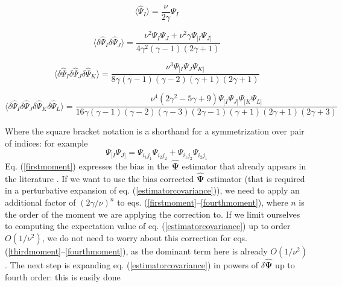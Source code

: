 \documentclass[reprint,aps,prd,superscriptaddress,showkeys,showpacs]{revtex4-1}
\newcommand{\bbh}[1]{\mathbf{\hat{#1}}}
\newcommand{\h}[1]{\hat{#1}}
\begin{document}
\begin{widetext}

\begin{equation}
\label{firstmoment}
\langle\h{\Psi}_I\rangle = \frac{\nu}{2\gamma}\Psi_I
\end{equation}

\begin{equation}
\label{secondmoment}
\langle\delta\h{\Psi}_I\delta\h{\Psi}_J\rangle = \frac{\nu^2\Psi_I\Psi_J + \nu^2\gamma\Psi_{[I}\Psi_{J]}}{4\gamma^2(\gamma-1)(2\gamma+1)}
\end{equation}

\begin{equation}
\label{thirdmoment}
\langle\delta\h{\Psi}_I\delta\h{\Psi}_J\delta\h{\Psi}_K\rangle = \frac{\nu^3\Psi_{[I}\Psi_J\Psi_{K]}}{8\gamma(\gamma-1)(\gamma-2)(\gamma+1)(2\gamma+1)}
\end{equation}

\begin{equation}
\label{fourthmoment}
\langle\delta\h{\Psi}_I\delta\h{\Psi}_J\delta\h{\Psi}_K\delta\h{\Psi}_L\rangle = \frac{\nu^4(2\gamma^2-5\gamma+9)\Psi_{[I}\Psi_{J]}\Psi_{[K}\Psi_{L]}}{16\gamma(\gamma-1)(\gamma-2)(\gamma-3)(2\gamma-1)(\gamma+1)(2\gamma+1)(2\gamma+3)}
\end{equation}

\end{widetext}
%
Where the square bracket notation is a shorthand for a symmetrization over pair of indices: for example
\begin{equation}
\Psi_{[I}\Psi_{J]} = \Psi_{i_1j_1}\Psi_{i_2j_2} + \Psi_{i_1j_2}\Psi_{i_2j_1}
\end{equation}
%
Eq. (\ref{firstmoment}) expresses the bias in the $\bbh{\Psi}$ estimator that already appears in the literature \citep{Hartlap07}. If we want to use the bias corrected $\bbh{\Psi}$ estimator (that is required in a perturbative expansion of eq. (\ref{estimatorcovariance})), we need to apply an additional factor of $(2\gamma/\nu)^n$ to eqs. (\ref{firstmoment}--\ref{fourthmoment}), where $n$ is the order of the moment we are applying the correction to. If we limit ourselves to computing the expectation value of eq. (\ref{estimatorcovariance}) up to order $O(1/\nu^2)$, we do not need to worry about this correction for eqs. (\ref{thirdmoment}--\ref{fourthmoment}), as the dominant term here is already $O(1/\nu^2)$. The next step is expanding eq. (\ref{estimatorcovariance}) in powers of $\delta\bbh{\Psi}$ up to fourth order: this is easily done
\end{document}
